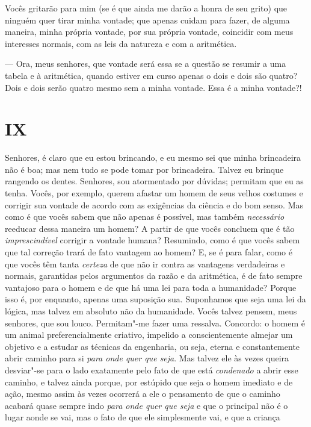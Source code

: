 Vocês gritarão para mim (se é que ainda me darão a honra de seu grito)
que ninguém quer tirar minha vontade; que apenas cuidam para fazer, de
alguma maneira, minha própria vontade, por sua própria vontade,
coincidir com meus interesses normais, com as leis da natureza e com a
aritmética.

--- Ora, meus senhores, que vontade será essa se a questão se resumir a
uma tabela e à aritmética, quando estiver em curso apenas o dois e dois
são quatro? Dois e dois serão quatro mesmo sem a minha vontade. Essa é
a minha vontade?!


\section{IX}

Senhores, é claro que eu estou brincando, e eu mesmo sei que minha brincadeira
não é boa; mas nem tudo se pode tomar por brincadeira.  Talvez eu brinque
rangendo os dentes. Senhores, sou atormentado por dúvidas; permitam que eu as
tenha. Vocês, por exemplo, querem afastar um homem de seus velhos costumes e
corrigir sua vontade de acordo com as exigências da ciência e do bom senso. Mas
como é que vocês sabem que não apenas é possível, mas também
\textit{necessário} reeducar dessa maneira um homem? A partir de que vocês
concluem que é tão \textit{imprescindível} corrigir a vontade humana?
Resumindo, como é que vocês sabem que tal correção trará de fato vantagem ao
homem? E, se é para falar, como é que vocês têm tanta \textit{certeza} de que
não ir contra as vantagens verdadeiras e normais, garantidas pelos argumentos
da razão e da aritmética, é de fato sempre vantajoso para o homem e de que há
uma lei para toda a humanidade? Porque isso é, por enquanto, apenas uma
suposição sua. Suponhamos que seja uma lei da lógica, mas talvez em absoluto
não da humanidade. Vocês talvez pensem, meus senhores, que sou louco.
Permitam"-me fazer uma ressalva. Concordo: o homem é um animal preferencialmente
criativo, impelido a conscientemente almejar um objetivo e a estudar as
técnicas da engenharia, ou seja, eterna e constantemente abrir caminho para si
\textit{para onde quer que seja}. Mas talvez ele às vezes queira desviar"-se
para o lado exatamente pelo fato de que está \textit{condenado} a abrir esse
caminho, e talvez ainda porque, por estúpido que seja o homem imediato e de
ação, mesmo assim às vezes ocorrerá a ele o pensamento de que o caminho acabará
quase sempre indo \textit{para onde quer que seja} e que o principal não é o
lugar aonde se vai, mas o fato de que ele simplesmente vai, e que a criança
